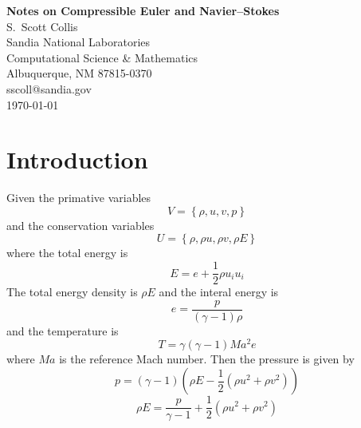 \documentclass[12pt]{article}
\begin{document}
\begin{center}
{\Large\bf Notes on Compressible Euler and Navier--Stokes}\\[2ex]
S.\ Scott Collis \\
Sandia National Laboratories \\
Computational Science \& Mathematics\\
Albuquerque, NM 87815-0370 \\
sscoll@sandia.gov \\[1ex]
\today
\end{center}

\section{Introduction}

Given the primative variables
\[ V = \left\{ \rho, u, v, p \right\} \]
and the conservation variables
\[ U = \left\{ \rho, \rho u, \rho v, \rho E \right\} \]
where the total energy is
\[ E = e + \frac{1}{2} \rho u_i u_i \]
The total energy density is $\rho E$ and the interal energy is 
\[ e = \frac{p}{(\gamma-1)\rho} \]
and the temperature is
\[ T = \gamma(\gamma-1) Ma^2 e \]
where $Ma$ is the reference Mach number.  Then the pressure is given by
\[ p = (\gamma-1)\left(\rho E - 
       \frac{1}{2}\left(\rho u^2 + \rho v^2\right)\right) \]
\[ \rho E = \frac{p}{\gamma-1} + 
            \frac{1}{2}\left(\rho u^2 + \rho v^2\right) \]
\end{document}
